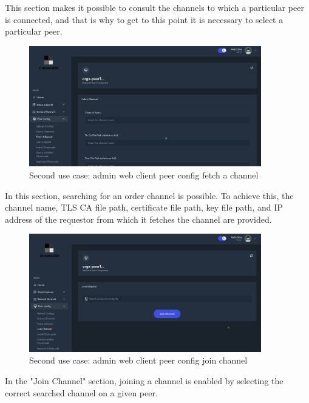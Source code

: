 This section makes it possible to consult the channels to which a particular peer is connected, and that is why to get to this point it is necessary to select a particular peer.

\begin{figure}[H]
    \centering
    \includegraphics[width=0.9\textwidth]{assets/use-case-2/peer-config-fetch-channel.png} %
    \caption{Second use case: admin web client peer config fetch a channel}
    \label{fig:sample-image} 
\end{figure}

In this section, searching for an order channel is possible. To achieve this, the channel name, TLS CA file path, certificate file path, key file path, and IP address of the requestor from which it fetches the channel are provided.

\begin{figure}[H]
    \centering
    \includegraphics[width=0.9\textwidth]{assets/use-case-2/peer-config-join-channel.png} %
    \caption{Second use case: admin web client peer config join channel}
    \label{fig:sample-image} 
\end{figure}

In the "Join Channel" section, joining a channel is enabled by selecting the correct searched channel on a given peer.

